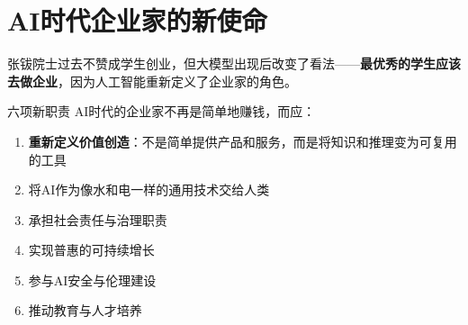 \section{AI时代企业家的新使命}

张钹院士过去不赞成学生创业，但大模型出现后改变了看法——\textbf{最优秀的学生应该去做企业}，因为人工智能重新定义了企业家的角色。

\begin{importantbox}{六项新职责}
AI时代的企业家不再是简单地赚钱，而应：
\begin{enumerate}
\item \textbf{重新定义价值创造}：不是简单提供产品和服务，而是将知识和推理变为可复用的工具
\item 将AI作为像水和电一样的通用技术交给人类
\item 承担社会责任与治理职责
\item 实现普惠的可持续增长
\item 参与AI安全与伦理建设
\item 推动教育与人才培养
\end{enumerate}
\end{importantbox}


